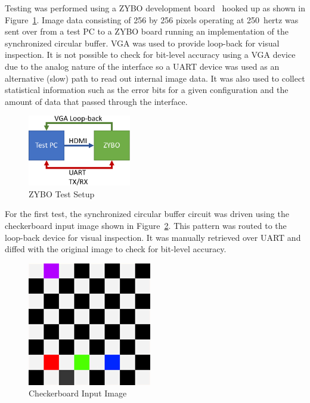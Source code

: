         Testing was performed using a ZYBO development board~\cite{Digilent2016} hooked up as shown in Figure~\ref{fig:zybo_setup}. Image data consisting of 256 by 256 pixels operating at \mbox{250 hertz} was sent over from a test PC to a ZYBO board running an implementation of the synchronized circular buffer. VGA was used to provide loop-back for visual inspection. It is not possible to check for bit-level accuracy using a VGA device due to the analog nature of the interface so a UART device was used as an alternative (slow) path to read out internal image data. It was also used to collect statistical information such as the error bits for a given configuration and the amount of data that passed through the interface.

        \begin{figure}[t]
            \centering
            \includegraphics[width=0.40\textwidth]{fig/zybo_setup.pdf}
            \caption{ZYBO Test Setup}
            \label{fig:zybo_setup}
        \end{figure}

        For the first test, the synchronized circular buffer circuit was driven using the checkerboard input image shown in Figure~\ref{fig:checker_pattern}. This pattern was routed to the loop-back device for visual inspection. It was manually retrieved over UART and diffed with the original image to check for bit-level accuracy.

        \begin{figure}[t]
            \centering
            \includegraphics{fig/checker.png}
            \caption{Checkerboard Input Image}
            \label{fig:checker_pattern}
        \end{figure}

